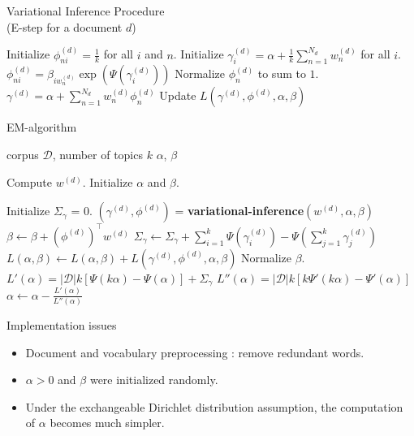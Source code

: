 \documentclass[final]{beamer}
\newlength{\onecolwid}
\begin{document}
\begin{frame}[t]
\begin{columns}[t]
\begin{column}{\onecolwid}
\begin{block}{Variational Inference Procedure \\ (E-step for a document $d$)}
\begin{algorithmic}[1]
\STATE Initialize $\phi_{ni}^{(d)} = \frac{1}{k}$ for all $i$ and $n$.
\STATE Initialize $\gamma_i^{(d)} = \alpha + \frac{1}{k}\sum_{n=1}^{N_d} w_n^{(d)}$ for all $i$.
\STATE $\phi_{ni}^{(d)} = \beta_{iw_n^{(d)}}\exp(\Psi(\gamma_i^{(d)}))$
\ENDFOR
\STATE Normalize $\phi_n^{(d)}$ to sum to $1$.
\ENDFOR
\STATE $\gamma^{(d)} = \alpha + \sum_{n=1}^{N_d} w_n^{(d)} \phi_n^{(d)}$
\STATE Update $L(\gamma^{(d)}, \phi^{(d)}, \alpha, \beta)$
\ENDWHILE
\end{algorithmic}
\end{block}


\begin{block}{EM-algorithm}

\begin{algorithmic}[1]
\REQUIRE corpus $\mathcal{D}$, number of topics $k$
\ENSURE $\alpha$, $\beta$

\STATE Compute $w^{(d)}$.
\ENDFOR
\STATE Initialize $\alpha$ and $\beta$.

\STATE Initialize $\Sigma_{\gamma}$ = 0.
\STATE $(\gamma^{(d)}, \phi^{(d)})$ = \textbf{variational-inference}$(w^{(d)}, \alpha, \beta)$
\STATE $\beta \leftarrow \beta + (\phi^{(d)})^{\top}w^{(d)}$
\STATE $\Sigma_{\gamma} \leftarrow \Sigma_{\gamma} + \sum_{i=1}^k \Psi (\gamma_i^{(d)}) - \Psi\left( \sum_{j=1}^k \gamma_j^{(d)}\right)$
\STATE $L(\alpha, \beta) \leftarrow L(\alpha, \beta) +L(\gamma^{(d)}, \phi^{(d)}, \alpha, \beta)$
\ENDFOR
\STATE Normalize $\beta$.
\STATE $L'(\alpha) = |\mathcal{D}| k \left[ \Psi\left( k \alpha \right) - \Psi(\alpha)\right] + \Sigma_{\gamma}$
\STATE $L''(\alpha) = |\mathcal{D}|k [k\Psi'(k\alpha) - \Psi' \left( \alpha\right)]$
\STATE $\alpha \leftarrow \alpha - \frac{L'(\alpha)}{L''(\alpha)}$
\ENDWHILE
\ENDWHILE
\end{algorithmic}
\end{block}

\begin{block}{Implementation issues}
\begin{itemize}
  \item Document and vocabulary preprocessing : remove redundant words.
  \item $\alpha > 0$ and $\beta$ were initialized randomly.
  \item Under the exchangeable Dirichlet distribution assumption, the computation of $\alpha$ becomes much simpler.
\end{itemize}
\end{block}
\end{column}


\end{columns}
\end{frame}
\end{document}
